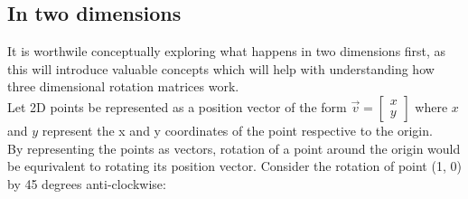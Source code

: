 \documentclass[12pt, a4paper]{article}
\begin{document}
\subsection{In two dimensions}
It is worthwile conceptually exploring what happens in two dimensions first, as
this will introduce valuable concepts which will help with understanding how
three dimensional rotation matrices work. \\

Let 2D points be represented as a position vector of the form $\vec{v} =
        \begin{bmatrix}x \\ y\end{bmatrix}$ where $x$ and $y$ represent the x
        and y coordinates of the point respective to the origin. \\

By representing the points as vectors, rotation of a point around the origin
would be equrivalent to rotating its position vector. Consider the rotation of
point (1, 0) by 45 degrees anti-clockwise:
\end{document}

